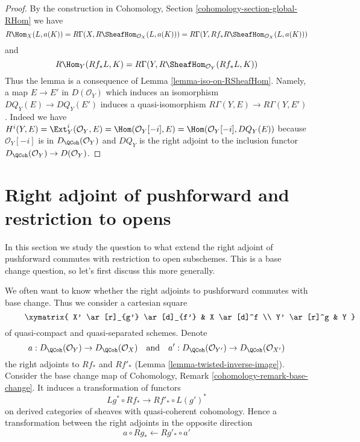 \begin{proof}
By the construction in
Cohomology, Section \ref{cohomology-section-global-RHom}
we have
$$
R\Hom_X(L, a(K)) =
R\Gamma(X, R\SheafHom_{\mathcal{O}_X}(L, a(K))) =
R\Gamma(Y, Rf_*R\SheafHom_{\mathcal{O}_X}(L, a(K)))
$$
and
$$
R\Hom_Y(Rf_*L, K) = R\Gamma(Y, R\SheafHom_{\mathcal{O}_Y}(Rf_*L, K))
$$
Thus the lemma is a consequence of Lemma \ref{lemma-iso-on-RSheafHom}.
Namely, a map $E \to E'$ in $D(\mathcal{O}_Y)$ which induces
an isomorphism $DQ_Y(E) \to DQ_Y(E')$ induces a quasi-isomorphism
$R\Gamma(Y, E) \to R\Gamma(Y, E')$. Indeed we have
$H^i(Y, E) = \Ext^i_Y(\mathcal{O}_Y, E) = \Hom(\mathcal{O}_Y[-i], E) =
\Hom(\mathcal{O}_Y[-i], DQ_Y(E))$ because $\mathcal{O}_Y[-i]$
is in $D_\QCoh(\mathcal{O}_Y)$ and $DQ_Y$ is the right adjoint
to the inclusion functor $D_\QCoh(\mathcal{O}_Y) \to D(\mathcal{O}_Y)$.
\end{proof}







\section{Right adjoint of pushforward and restriction to opens}
\label{section-restriction-to-opens}

\noindent
In this section we study the question to what extend the right adjoint
of pushforward commutes with restriction to open subschemes. This is
a base change question, so let's first discuss this more generally.

\medskip\noindent
We often want to know whether the right adjoints to pushforward commutes
with base change. Thus we consider a cartesian square
\begin{equation}
\label{equation-base-change}
\vcenter{
\xymatrix{
X' \ar[r]_{g'} \ar[d]_{f'} & X \ar[d]^f \\
Y' \ar[r]^g & Y
}
}
\end{equation}
of quasi-compact and quasi-separated schemes.
Denote
$$
a  : D_\QCoh(\mathcal{O}_Y) \to D_\QCoh(\mathcal{O}_X)
\quad\text{and}\quad
a'  : D_\QCoh(\mathcal{O}_{Y'}) \to D_\QCoh(\mathcal{O}_{X'})
$$
the right adjoints to $Rf_*$ and $Rf'_*$
(Lemma \ref{lemma-twisted-inverse-image}).
Consider the base change map of
Cohomology, Remark \ref{cohomology-remark-base-change}.
It induces a transformation of functors
$$
Lg^* \circ Rf_* \longrightarrow Rf'_* \circ L(g')^*
$$
on derived categories of sheaves with quasi-coherent cohomology.
Hence a transformation between the right adjoints in the opposite direction
$$
a \circ Rg_* \longleftarrow Rg'_* \circ a'
$$

